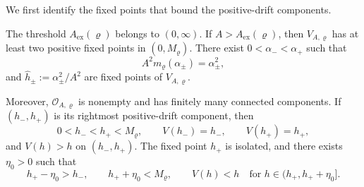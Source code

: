 \documentclass[11pt,reqno,a4paper]{article}
\begin{document}
We first identify the fixed points that bound the positive-drift components.
\begin{proposition}
\label{prop:metastable-positive-fixed-points}
  The threshold $A_{\mathrm{ex}}(\varrho)$ belongs to $(0,\infty)$. If
  $A>A_{\mathrm{ex}}(\varrho)$, then $V_{A,\varrho}$ has at least two
  positive fixed points in
  $(0,M_\varrho)$. There exist
  $0<\alpha_-<\alpha_+$ such that
  \begin{equation}\label{eq:metastable-alpha-fixed-points}
    A^2m_\varrho(\alpha_\pm)=\alpha_\pm^2,
  \end{equation}
  and $\widehat h_\pm:=\alpha_\pm^2/A^2$ are fixed points of
  $V_{A,\varrho}$.

  Moreover, $\mathcal O_{A,\varrho}$ is nonempty and has finitely many
  connected components. If $(h_-,h_+)$ is its rightmost positive-drift
  component, then
  \begin{equation}\label{eq:metastable-component-fixed-points}
    0<h_-<h_+<M_\varrho,
    \qquad
    V(h_-)=h_-,
    \qquad
    V(h_+)=h_+,
  \end{equation}
  and $V(h)>h$ on $(h_-,h_+)$. The fixed point $h_+$ is isolated, and there
  exists $\eta_0>0$ such that
  \begin{equation}\label{eq:metastable-right-stability}
    h_+-\eta_0>h_-,
    \qquad
    h_++\eta_0<M_\varrho,
    \qquad
    V(h)<h
    \quad\mbox{for }h\in(h_+,h_++\eta_0].
  \end{equation}
\end{proposition}
\end{document}
